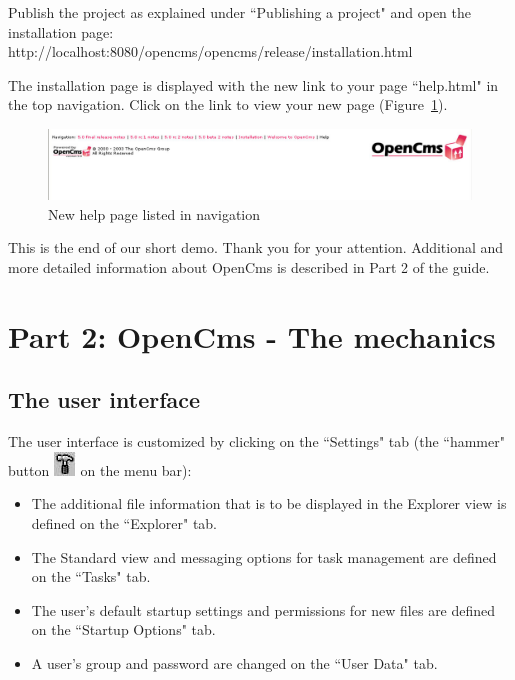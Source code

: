 Publish the project as explained under ``Publishing a project" and
open the installation page:\\
http://localhost:8080/opencms/opencms/release/installation.html

The installation page is displayed with the new link to your page ``help.html" in the top navigation.
Click on the link to
view your new page (Figure~\ref{demopage03}). 

\begin{figure}[!hbt]
\begin{center}
\includegraphics[width=\sgw]
                   {pics/usermanual/demoPage03}
\caption[New help page listed in navigation]
           {New help page listed in navigation}
\label{demopage03}
\end{center}
\end{figure}

This is the end of our short demo. Thank you for your attention. Additional and more detailed information about OpenCms is described in Part 2 of the guide.
\newpage
\section{Part 2: OpenCms - The mechanics}

\subsection{The user interface}
The user interface is customized by clicking on the ``Settings" tab
(the ``hammer" button \includegraphics{pics/usermanual/ic_settings}
on the menu bar):

\begin{itemize}
\item The additional file information that is to be displayed in the Explorer view is defined on the ``Explorer" tab.
\item The Standard view and messaging options for task management are defined on the ``Tasks" tab.
\item The user's default startup settings and permissions for new files are defined on the ``Startup Options" tab.
\item A user's group and password are changed on the ``User Data" tab.
\end{itemize}

